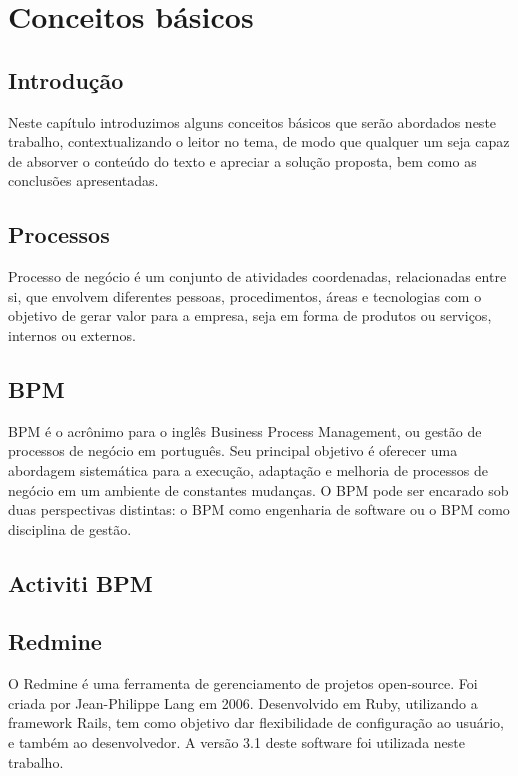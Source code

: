 \chapter{Conceitos básicos}\label{chp:conceitos_basicos}

\section{Introdução}\label{sec:conceitos_basicos-introducao}
Neste capítulo introduzimos alguns conceitos básicos que serão abordados neste trabalho, contextualizando o leitor no tema, de modo que qualquer um seja capaz de absorver o conteúdo do texto e apreciar a solução proposta, bem como as conclusões apresentadas.

\section{Processos}\label{sec:conceitos_basicos-processos}
Processo de negócio é um conjunto de atividades coordenadas, relacionadas entre si, que envolvem diferentes pessoas, procedimentos, áreas e tecnologias com o objetivo de gerar valor para a empresa, seja em forma de produtos ou serviços, internos ou externos.

\section{BPM}\label{sec:conceitos_basicos-bpm}
BPM é o acrônimo para o inglês Business Process Management, ou gestão de processos de negócio em português. Seu principal objetivo é oferecer uma abordagem sistemática para a execução, adaptação e melhoria de processos de negócio em um ambiente de constantes mudanças. O BPM pode ser encarado sob duas perspectivas distintas: o BPM como engenharia de software ou o BPM como disciplina de gestão.

\section{Activiti BPM}\label{sec:conceitos_basicos-activiti}


\section{Redmine}\label{sec:conceitos_basicos-redmine}
O Redmine é uma ferramenta de gerenciamento de projetos open-source. Foi criada por Jean-Philippe Lang em 2006. Desenvolvido em Ruby, utilizando a framework Rails, tem como objetivo dar flexibilidade de configuração ao usuário, e também ao desenvolvedor. A versão 3.1 deste software foi utilizada neste trabalho.


